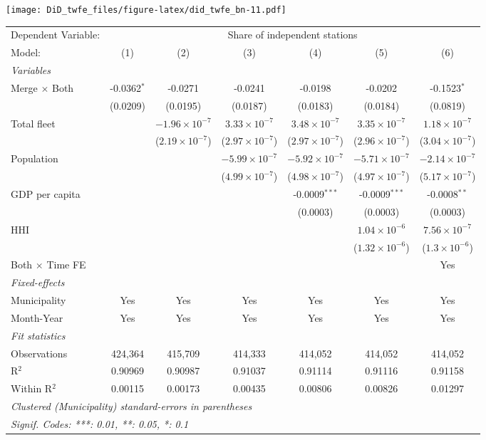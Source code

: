 \documentclass[
]{article}
\begin{document}
\texttt{[image: DiD\_twfe\_files/figure-latex/did\_twfe\_bn-11.pdf]}

\begin{tabular}{lcccccc}
\tabularnewline\midrule\midrule
Dependent Variable:&\multicolumn{6}{c}{Share of independent stations}\\
Model:&(1) & (2) & (3) & (4) & (5) & (6)\\
\midrule \emph{Variables}&   &   &   &   &   &  \\
Merge $\times $ Both & -0.0362$^{*}$ & -0.0271 & -0.0241 & -0.0198 & -0.0202 & -0.1523$^{*}$\\
  &(0.0209) & (0.0195) & (0.0187) & (0.0183) & (0.0184) & (0.0819)\\
Total fleet &    & $-1.96\times 10^{-7}$ & $3.33\times 10^{-7}$ & $3.48\times 10^{-7}$ & $3.35\times 10^{-7}$ & $1.18\times 10^{-7}$\\
  &   & ($2.19\times 10^{-7}$) & ($2.97\times 10^{-7}$) & ($2.97\times 10^{-7}$) & ($2.96\times 10^{-7}$) & ($3.04\times 10^{-7}$)\\
Population &    &    & $-5.99\times 10^{-7}$ & $-5.92\times 10^{-7}$ & $-5.71\times 10^{-7}$ & $-2.14\times 10^{-7}$\\
  &   &    & ($4.99\times 10^{-7}$) & ($4.98\times 10^{-7}$) & ($4.97\times 10^{-7}$) & ($5.17\times 10^{-7}$)\\
GDP per capita &    &    &    & -0.0009$^{***}$ & -0.0009$^{***}$ & -0.0008$^{**}$\\
  &   &    &    & (0.0003) & (0.0003) & (0.0003)\\
HHI &    &    &    &    & $1.04\times 10^{-6}$ & $7.56\times 10^{-7}$\\
  &   &    &    &    & ($1.32\times 10^{-6}$) & ($1.3\times 10^{-6}$)\\
Both $\times$ Time FE &  &  &  &  &  & Yes\\
\midrule \emph{Fixed-effects}&   &   &   &   &   &  \\
Municipality & Yes & Yes & Yes & Yes & Yes & Yes\\
Month-Year & Yes & Yes & Yes & Yes & Yes & Yes\\
\midrule \emph{Fit statistics}&  & & & & & \\
Observations & 424,364&415,709&414,333&414,052&414,052&414,052\\
R$^2$ & 0.90969&0.90987&0.91037&0.91114&0.91116&0.91158\\
Within R$^2$ & 0.00115&0.00173&0.00435&0.00806&0.00826&0.01297\\
\midrule\midrule\multicolumn{7}{l}{\emph{Clustered (Municipality) standard-errors in parentheses}}\\
\multicolumn{7}{l}{\emph{Signif. Codes: ***: 0.01, **: 0.05, *: 0.1}}\\
\end{tabular}
\end{document}
